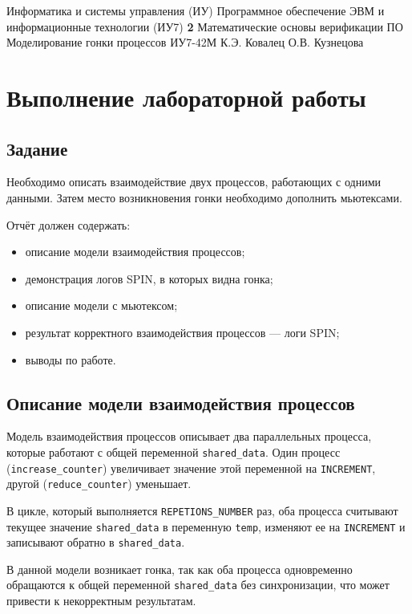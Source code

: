 \documentclass{bmstu}
\begin{document}
\makereporttitle
{Информатика и системы управления (ИУ)}
{Программное обеспечение ЭВМ и информационные технологии (ИУ7)}
{\textbf{2}}
{Математические основы верификации ПО}
{Моделирование гонки процессов}
{}
{ИУ7-42М}
{К.Э. Ковалец}
{О.В. Кузнецова}


\setcounter{page}{2}


\chapter{Выполнение лабораторной работы}

\section{Задание}

Необходимо описать взаимодействие двух процессов, работающих с одними данными. Затем место возникновения гонки необходимо дополнить мьютексами.

Отчёт должен содержать:
\begin{itemize}
  \item описание модели взаимодействия процессов;
  \item демонстрация логов SPIN, в которых видна гонка;
  \item описание модели с мьютексом;
  \item результат корректного взаимодействия процессов --- логи SPIN;
  \item выводы по работе.
\end{itemize}

\section{Описание модели взаимодействия процессов}

Модель взаимодействия процессов описывает два параллельных процесса, которые работают с общей переменной \texttt{shared\_data}. Один процесс (\texttt{increase\_counter}) увеличивает значение этой переменной на \texttt{INCREMENT}, другой (\texttt{reduce\_counter}) уменьшает. 

В цикле, который выполняется \texttt{REPETIONS\_NUMBER} раз, оба процесса считывают текущее значение \texttt{shared\_data} в переменную \texttt{temp}, изменяют ее на \texttt{INCREMENT} и записывают обратно в \texttt{shared\_data}.

В данной модели возникает гонка, так как оба процесса одновременно обращаются к общей переменной \texttt{shared\_data} без синхронизации, что может привести к некорректным результатам.
\end{document}
